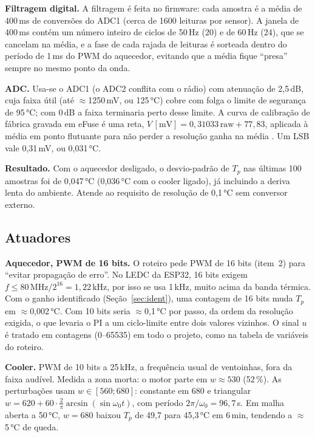 \documentclass[a4paper]{ifacconf}
\begin{document}
\textbf{Filtragem digital.} A filtragem é feita no firmware: cada amostra é a média de 400\,ms
de conversões do ADC1 (cerca de 1600 leituras por sensor). A janela de 400\,ms contém um número
inteiro de ciclos de 50\,Hz (20) e de 60\,Hz (24), que se cancelam na média, e a fase de cada
rajada de leituras é sorteada dentro do período de 1\,ms do PWM do aquecedor, evitando que a
média fique ``presa'' sempre no mesmo ponto da onda.

\textbf{ADC.} Usa-se o ADC1 (o ADC2 conflita com o rádio) com atenuação de 2,5\,dB, cuja faixa
útil (até $\approx$1250\,mV, ou 125\,°C) cobre com folga o limite de segurança de 95\,°C; com
0\,dB a faixa terminaria perto desse limite. A curva de calibração de fábrica gravada em eFuse é
uma reta, $V\,[\mathrm{mV}] = 0{,}31033\,\mathrm{raw} + 77{,}83$, aplicada à média em ponto
flutuante para não perder a resolução ganha na média \citep{Espressif:IDF}. Um LSB vale
0,31\,mV, ou 0,031\,°C.

\textbf{Resultado.} Com o aquecedor desligado, o desvio-padrão de $T_p$ nas últimas 100 amostras
foi de 0,047\,°C (0,036\,°C com o cooler ligado), já incluindo a deriva lenta do ambiente.
Atende ao requisito de resolução de 0,1\,°C sem conversor externo.

\subsection{Atuadores}

\textbf{Aquecedor, PWM de 16 bits.} O roteiro pede PWM de 16 bits (item~2) para ``evitar
propagação de erro''. No LEDC da ESP32, 16 bits exigem $f\le 80\,\mathrm{MHz}/2^{16}=1{,}22$\,kHz,
por isso se usa 1\,kHz, muito acima da banda térmica. Com o ganho identificado
(Seção~\ref{sec:ident}), uma contagem de 16 bits muda $T_p$ em $\approx$0,002\,°C. Com 10 bits
seria $\approx$0,1\,°C por passo, da ordem da resolução exigida, o que levaria o PI a um
ciclo-limite entre dois valores vizinhos. O sinal $u$ é tratado em contagens (0--65535) em todo
o projeto, como na tabela de variáveis do roteiro.

\textbf{Cooler.} PWM de 10 bits a 25\,kHz, a frequência usual de ventoinhas, fora da faixa
audível. Medida a zona morta: o motor parte em $w\approx 530$ (52\,\%). As perturbações usam
$w\in[560;680]$: constante em 680 e triangular $w=620+60\cdot\frac{2}{\pi}\arcsin(\sin\omega_0 t)$,
com período $2\pi/\omega_0=96{,}7$\,s. Em malha aberta a 50\,°C, $w=680$ baixou $T_p$ de 49,7
para 45,3\,°C em 6\,min, tendendo a $\approx$5\,°C de queda.
\end{document}
